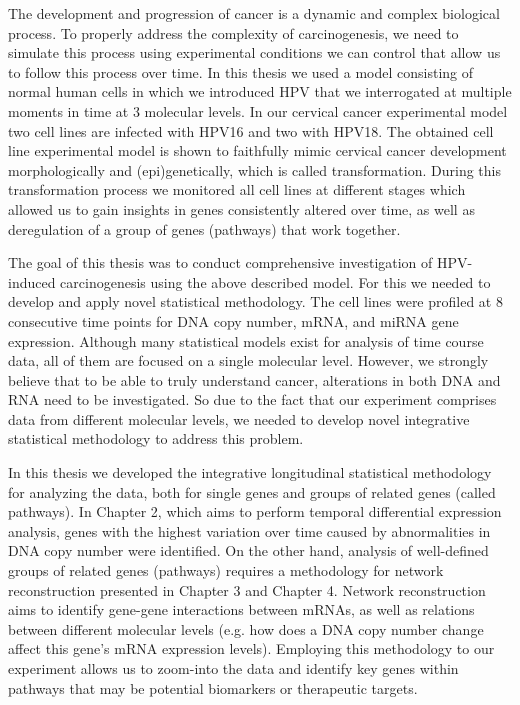 \begin{summary}
The development and progression of cancer is a dynamic and complex biological process. To properly address the complexity of carcinogenesis, we need to simulate this process using experimental conditions we can control that allow us to follow this process over time. In this thesis we used a model consisting of normal human cells in which we introduced  HPV that we interrogated at multiple moments in time at 3 molecular levels. In our cervical cancer experimental model two cell lines are infected with HPV16 and two with HPV18. The obtained cell line experimental model is shown to faithfully mimic cervical cancer development morphologically and (epi)genetically, which is called transformation. During this transformation process we monitored all cell lines at different stages which allowed us to gain insights in genes consistently altered over time, as well as deregulation of a group of genes (pathways) that work together. 

The goal of this thesis was to conduct comprehensive investigation of HPV-induced carcinogenesis using the above described model. For this we needed to develop and apply novel statistical methodology.  The cell lines were profiled at 8 consecutive time points for DNA copy number, mRNA, and miRNA gene expression. Although many statistical models exist for analysis of time course data, all of them are focused on a single molecular level. However, we strongly believe that to be able to truly understand cancer, alterations in both DNA and RNA need to be investigated. So due to the fact that our experiment comprises data from different molecular levels, we needed to develop novel integrative statistical methodology to address this problem.
 
 In this thesis we developed the integrative longitudinal statistical methodology for analyzing the data, both for single genes and groups of related genes (called pathways). In Chapter 2, which aims to perform temporal differential expression analysis, genes with the highest variation over time caused by abnormalities in DNA copy number were identified. On the other hand, analysis of well-defined groups of related genes (pathways) requires a methodology for network reconstruction presented in Chapter 3 and Chapter 4. Network reconstruction aims to identify gene-gene interactions between mRNAs, as well as relations between different molecular levels (e.g. how does a DNA copy number change affect this gene's mRNA expression levels). Employing this methodology to our experiment allows us to zoom-into the data and identify key genes within pathways that may be  potential biomarkers or therapeutic targets.


\end{summary}
